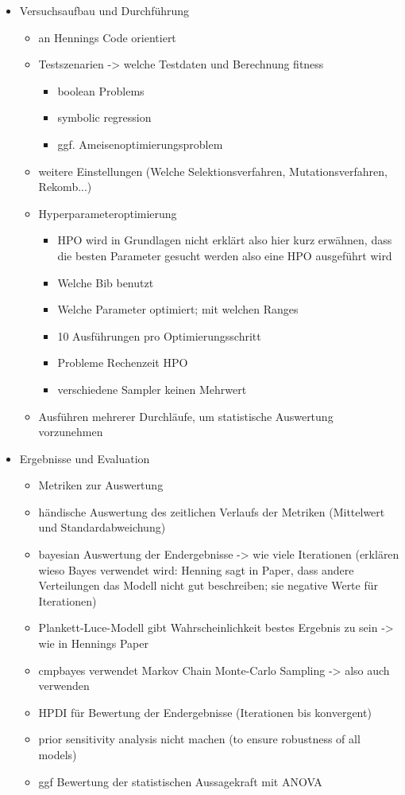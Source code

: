\begin{itemize}
    \item Versuchsaufbau und Durchführung
    \begin{itemize}
        \item an Hennings Code orientiert
        \item Testszenarien -> welche Testdaten und Berechnung fitness
        \begin{itemize}
            \item boolean Problems
            \item symbolic regression
            \item ggf. Ameisenoptimierungsproblem
        \end{itemize}
        \item weitere Einstellungen (Welche Selektionsverfahren, Mutationsverfahren, Rekomb...)
        \item Hyperparameteroptimierung
        \begin{itemize}
        	\item HPO wird in Grundlagen nicht erklärt also hier kurz erwähnen, dass die besten Parameter gesucht werden also eine HPO ausgeführt wird
            \item Welche Bib benutzt
            \item Welche Parameter optimiert; mit welchen Ranges
            \item 10 Ausführungen pro Optimierungsschritt
            \item Probleme Rechenzeit HPO
            \item verschiedene Sampler keinen Mehrwert
        \end{itemize}
        \item Ausführen mehrerer Durchläufe, um statistische Auswertung vorzunehmen
    \end{itemize}
    \item Ergebnisse und Evaluation
    \begin{itemize}
        \item Metriken zur Auswertung
        \item händische Auswertung des zeitlichen Verlaufs der Metriken (Mittelwert und Standardabweichung)
        \item bayesian Auswertung der Endergebnisse -> wie viele Iterationen (erklären wieso Bayes verwendet wird: Henning sagt in Paper, dass andere Verteilungen das Modell nicht gut beschreiben; sie negative Werte für Iterationen)
        \item Plankett-Luce-Modell gibt Wahrscheinlichkeit bestes Ergebnis zu sein -> wie in Hennings Paper
        \item cmpbayes verwendet Markov Chain Monte-Carlo Sampling -> also auch verwenden
        \item HPDI für Bewertung der Endergebnisse (Iterationen bis konvergent)
        \item prior sensitivity analysis nicht machen (to ensure robustness of all models)
        \item ggf Bewertung der statistischen Aussagekraft mit ANOVA
    \end{itemize}
\end{itemize}

